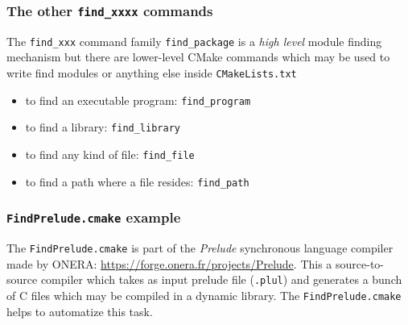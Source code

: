 \documentclass[compress,slidestop,table,usepdftitle=false
              ]
               {beamer}
\newcommand{\fname}[1]{\texttt{#1}}
\begin{document}
\begin{frame}[fragile]
\frametitle{The other \lstinline!find_xxxx! commands}
\begin{block}{The \lstinline!find_xxx! command family}
\lstinline!find_package! is a \emph{high level} module finding mechanism
but there are lower-level CMake commands which may be used to write
find modules or anything else inside \fname{CMakeLists.txt}
\end{block}
\begin{itemize}
\item to find an executable program: \lstinline!find_program!
\item to find a library: \lstinline!find_library!
\item to find any kind of file: \lstinline!find_file!
\item to find a path where a file resides: \lstinline!find_path!
\end{itemize}
\end{frame}

\begin{frame}
  \frametitle{\texttt{FindPrelude.cmake} example}

  The \texttt{FindPrelude.cmake} is part of the \emph{Prelude} synchronous language compiler made by ONERA:
  \url{https://forge.onera.fr/projects/Prelude}. This a source-to-source compiler which takes as input prelude file (\texttt{.plul}) and generates a bunch of C files which may be compiled in a dynamic library. The \texttt{FindPrelude.cmake} helps to automatize this task.

  
\end{frame}
\end{document}
